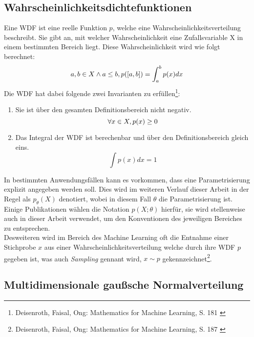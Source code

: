 \subsection{Wahrscheinlichkeitsdichtefunktionen}
Eine \ac{WDF} ist eine reelle Funktion $p$, welche eine Wahrscheinlichkeitsverteilung beschreibt. Sie gibt an, mit welcher Wahrscheinlichkeit eine Zufallsvariable X in einem bestimmten Bereich liegt. Diese Wahrscheinlichkeit wird wie folgt berechnet:
\begin{equation}
    a,b \in X \land a \le b, \space p([a, b]) = \int_a^b p(x) dx
\end{equation}
Die \ac{WDF} hat dabei folgende zwei Invarianten zu erfüllen\footnote{
    Deisenroth, Faisal, Ong: Mathematics for Machine Learning, S. 181
    \cite{Deisenroth2020}
}:
\begin{enumerate}
    \item Sie ist über den gesamten Definitionsbereich nicht negativ. 
    \begin{equation}
        \forall x \in X, \space p(x) \ge 0
    \end{equation}
    \item Das Integral der \ac{WDF} ist berechenbar und über den Definitionsbereich gleich eins.
    \begin{equation}
        \int p(x) dx = 1
    \end{equation}
\end{enumerate}
In bestimmten Anwendungsfällen kann es vorkommen, dass eine Parametrisierung explizit angegeben werden soll. Dies wird im weiteren Verlauf dieser Arbeit in der Regel als $p_\theta(X)$ denotiert, wobei in diesem Fall $\theta$ die Parametrisierung ist. Einige Publikationen wählen die Notation $p(X; \theta)$ hierfür, sie wird stellenweise auch in dieser Arbeit verwendet, um den Konventionen des jeweiligen Bereiches zu entsprechen. \\
Desweiteren wird im Bereich des Machine Learning oft die Entnahme einer Stichprobe $x$ aus einer Wahrscheinlichkeitsverteilung welche durch ihre \ac{WDF} $p$ gegeben ist, was auch \textit{Sampling} gennant wird, $x \sim p$ gekennzeichnet\footnote{
    Deisenroth, Faisal, Ong: Mathematics for Machine Learning, S. 187
    \cite{Deisenroth2020}
}. 


\subsection{Multidimensionale gaußsche Normalverteilung}

